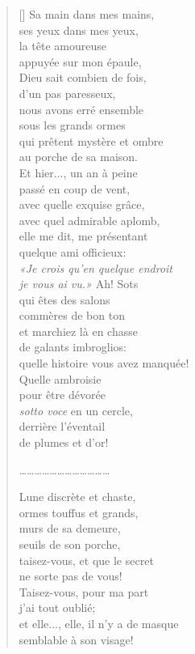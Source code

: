 \documentclass[a4paper,12pt]{book}
\begin{document}
\begin{verse}[\versewidth]
  Sa main dans mes mains, \\
  ses yeux dans mes yeux, \\
  la tête amoureuse \\
  appuyée sur mon épaule, \\
  Dieu sait combien de fois, \\
  d'un pas paresseux, \\
  nous avons erré ensemble \\
  sous les grands ormes \\
  qui prêtent mystère et ombre \\
  au porche de sa maison. \\
  Et hier..., un an à peine \\
  passé en coup de vent, \\
  avec quelle exquise grâce, \\
  avec quel admirable aplomb, \\
  elle me dit, me présentant  \\
  quelque ami officieux: \\
  \emph{«Je crois qu'en quelque endroit \\
    je vous ai vu.»} Ah! Sots \\
  qui êtes des salons \\
  commères de bon ton \\
  et marchiez là en chasse \\
  de galants imbroglios: \\
  quelle histoire vous avez manquée! \\
  Quelle ambroisie \\
  pour être dévorée \\
  \emph{sotto voce} en un cercle, \\
  derrière l'éventail \\
  de plumes et d'or!

\ldots\ldots\ldots\ldots\ldots\ldots\ldots\ldots\ldots\ldots\ldots\ldots

  Lune discrète et chaste, \\
  ormes touffus et grands, \\
  murs de sa demeure, \\
  seuils de son porche, \\
  taisez-vous, et que le secret \\
  ne sorte pas de vous! \\
  Taisez-vous, pour ma part \\
  j'ai tout oublié; \\
  et elle..., elle, il n'y a de masque \\
  semblable à son visage!
\end{verse}
\end{document}
